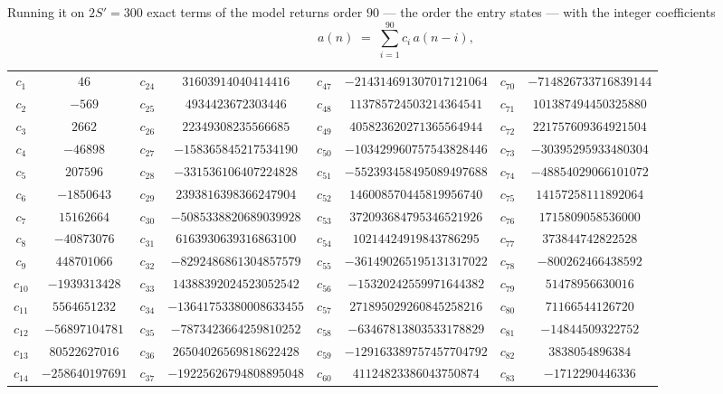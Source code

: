 \documentclass[11pt,a4paper]{article}
\theoremstyle{plain}
\theoremstyle{definition}
\begin{document}
Running it on $2S'=300$ exact terms of the model returns order $90$ --- the order the
entry states --- with the integer coefficients
\[
a(n)\;=\;\sum_{i=1}^{90}c_i\,a(n-i),
\]
\begin{center}\small
\begin{tabular}{cccccccc}
$c_{1}$ & $46$ & $c_{24}$ & $31603914040414416$ & $c_{47}$ & $-214314691307017121064$ & $c_{70}$ & $-714826733716839144$ \\
$c_{2}$ & $-569$ & $c_{25}$ & $4934423672303446$ & $c_{48}$ & $113785724503214364541$ & $c_{71}$ & $101387494450325880$ \\
$c_{3}$ & $2662$ & $c_{26}$ & $22349308235566685$ & $c_{49}$ & $405823620271365564944$ & $c_{72}$ & $221757609364921504$ \\
$c_{4}$ & $-46898$ & $c_{27}$ & $-158365845217534190$ & $c_{50}$ & $-103429960757543828446$ & $c_{73}$ & $-30395295933480304$ \\
$c_{5}$ & $207596$ & $c_{28}$ & $-331536106407224828$ & $c_{51}$ & $-552393458495089497688$ & $c_{74}$ & $-48854029066101072$ \\
$c_{6}$ & $-1850643$ & $c_{29}$ & $2393816398366247904$ & $c_{52}$ & $146008570445819956740$ & $c_{75}$ & $14157258111892064$ \\
$c_{7}$ & $15162664$ & $c_{30}$ & $-5085338820689039928$ & $c_{53}$ & $372093684795346521926$ & $c_{76}$ & $1715809058536000$ \\
$c_{8}$ & $-40873076$ & $c_{31}$ & $6163930639316863100$ & $c_{54}$ & $10214424919843786295$ & $c_{77}$ & $373844742822528$ \\
$c_{9}$ & $448701066$ & $c_{32}$ & $-8292486861304857579$ & $c_{55}$ & $-361490265195131317022$ & $c_{78}$ & $-800262466438592$ \\
$c_{10}$ & $-1939313428$ & $c_{33}$ & $14388392024523052542$ & $c_{56}$ & $-15320242559971644382$ & $c_{79}$ & $51478956630016$ \\
$c_{11}$ & $5564651232$ & $c_{34}$ & $-13641753380008633455$ & $c_{57}$ & $271895029260845258216$ & $c_{80}$ & $71166544126720$ \\
$c_{12}$ & $-56897104781$ & $c_{35}$ & $-7873423664259810252$ & $c_{58}$ & $-63467813803533178829$ & $c_{81}$ & $-14844509322752$ \\
$c_{13}$ & $80522627016$ & $c_{36}$ & $26504026569818622428$ & $c_{59}$ & $-129163389757457704792$ & $c_{82}$ & $3838054896384$ \\
$c_{14}$ & $-258640197691$ & $c_{37}$ & $-19225626794808895048$ & $c_{60}$ & $41124823386043750874$ & $c_{83}$ & $-1712290446336$ \\

\end{tabular}
\end{center}
\end{document}

